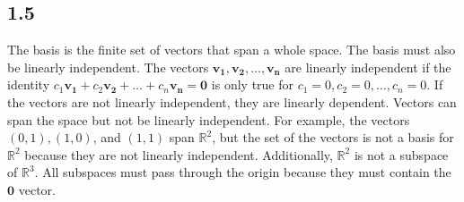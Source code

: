 \documentclass{article}
\begin{document}
    \subsection*{1.5}
    The basis is the finite set of vectors that span a whole space. 
    The basis must also be linearly independent. 
    The vectors $\mathbf{v_1, v_2, \dots, v_n}$ are linearly independent 
    if the identity $c_1 \mathbf{v_1} + c_2 \mathbf{v_2} + \dots + c_n \mathbf{v_n} = \mathbf{0}$ 
    is only true for $c_1 = 0, c_2 = 0, \dots, c_n = 0$. 
    If the vectors are not linearly independent, they are linearly dependent. 
    Vectors can span the space but not be linearly independent. 
    For example, the vectors $(0, 1), (1, 0)$, and $(1, 1)$ span $\mathbb{R}^2$,
    but the set of the vectors is not a basis for $\mathbb{R}^2$ because they are not linearly independent.
    Additionally, $\mathbb{R}^2$ is not a subspace of $\mathbb{R}^3$. 
    All subspaces must pass through the origin because they must contain the $\mathbf{0}$ vector. 

\section{}
\end{document}
